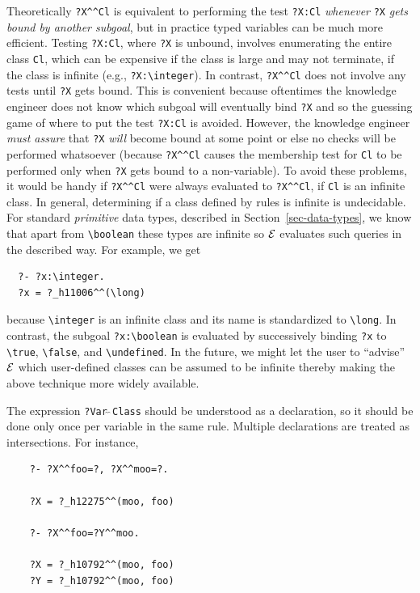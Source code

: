 \documentclass[11pt]{article}
\newcommand{\ERGO}{\mbox{\ensuremath{\cal{E}}\smaller{{\sc{RGO}}}}\xspace}
\newcommand{\bs}{\textbackslash}
\begin{document}
Theoretically \verb|?X^^Cl| is equivalent to performing the test
\texttt{?X:Cl} \emph{whenever} \texttt{?X} \emph{gets bound by another subgoal},
but in practice typed variables can be much more efficient.
Testing \texttt{?X:Cl}, where \texttt{?X} is unbound,
involves enumerating the entire class
\texttt{Cl}, which can be expensive if the class is large and may not
terminate, if the class is infinite (e.g., \texttt{?X:\bs{}integer}). 
In contrast, \verb|?X^^Cl| does not involve any tests until \texttt{?X}
gets bound. This is convenient because oftentimes the knowledge engineer does
not know which subgoal will eventually bind \texttt{?X} and so the guessing game
of where to put the test \texttt{?X:Cl} is avoided.
However, the knowledge engineer \emph{must assure}    that \texttt{?X}
\emph{will} become bound at some point or else no checks will be performed whatsoever
(because \verb|?X^^Cl| causes the membership test for \texttt{Cl} to be
performed only when \texttt{?X} gets bound to a non-variable).    
To avoid these problems, it would be handy if \verb|?X^^Cl| were always
evaluated to \verb|?X^^Cl|, if \texttt{Cl} is an infinite class. In
general, determining if a class defined by rules is infinite is undecidable.
For standard \emph{primitive} data types, described in
Section~\ref{sec-data-types}, we know that apart from \verb|\boolean| these
types are infinite so \ERGO evaluates such queries in the
described way. For example,  we get
\begin{verbatim}
  ?- ?x:\integer.
  ?x = ?_h11006^^(\long)
\end{verbatim}
because \verb|\integer| is an infinite class and its name is standardized
to \verb|\long|. In contrast, the subgoal \verb|?x:\boolean|
is evaluated by successively binding \texttt{?x} to \verb|\true|,
\verb|\false|, and \verb|\undefined|. 
In the future, we might let the user to ``advise'' \ERGO which user-defined
classes can be assumed to be infinite thereby making the above technique more
widely available.


The expression
\texttt{?Var$\hat{~}\hat{~}$Class} should be understood as a declaration,
so it should be done only once per variable in the same rule.
Multiple declarations are treated as intersections. For instance,
\begin{verbatim}
    ?- ?X^^foo=?, ?X^^moo=?.

    ?X = ?_h12275^^(moo, foo)

    ?- ?X^^foo=?Y^^moo.

    ?X = ?_h10792^^(moo, foo)
    ?Y = ?_h10792^^(moo, foo)

\end{verbatim}
\end{document}

